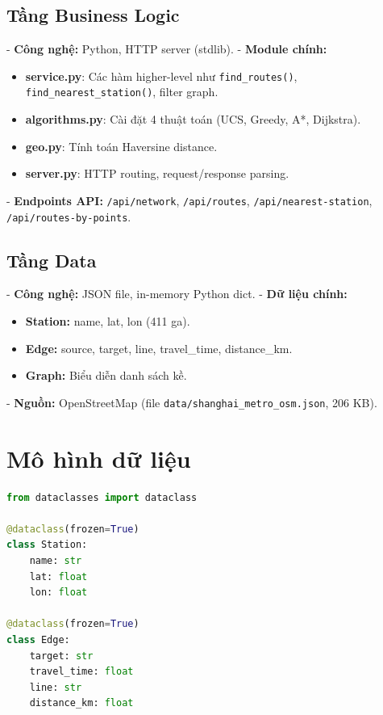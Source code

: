 \subsection{Tầng Business Logic}

- \textbf{Công nghệ:} Python, HTTP server (stdlib).
- \textbf{Module chính:}
  \begin{itemize}
    \item \textbf{service.py}: Các hàm higher-level như \texttt{find\_routes()}, \texttt{find\_nearest\_station()}, filter graph.
    \item \textbf{algorithms.py}: Cài đặt 4 thuật toán (UCS, Greedy, A*, Dijkstra).
    \item \textbf{geo.py}: Tính toán Haversine distance.
    \item \textbf{server.py}: HTTP routing, request/response parsing.
  \end{itemize}
- \textbf{Endpoints API:} \texttt{/api/network}, \texttt{/api/routes}, \texttt{/api/nearest-station}, \texttt{/api/routes-by-points}.

\subsection{Tầng Data}

- \textbf{Công nghệ:} JSON file, in-memory Python dict.
- \textbf{Dữ liệu chính:}
  \begin{itemize}
    \item \textbf{Station:} name, lat, lon (411 ga).
    \item \textbf{Edge:} source, target, line, travel\_time, distance\_km.
    \item \textbf{Graph:} Biểu diễn danh sách kề.
  \end{itemize}
- \textbf{Nguồn:} OpenStreetMap (file \texttt{data/shanghai\_metro\_osm.json}, 206 KB).

\section{Mô hình dữ liệu}

\begin{lstlisting}[language=Python, caption=Dataclass Station và Edge (metro\_app/data.py)]
from dataclasses import dataclass

@dataclass(frozen=True)
class Station:
    name: str
    lat: float
    lon: float

@dataclass(frozen=True)
class Edge:
    target: str
    travel_time: float
    line: str
    distance_km: float
\end{lstlisting}

